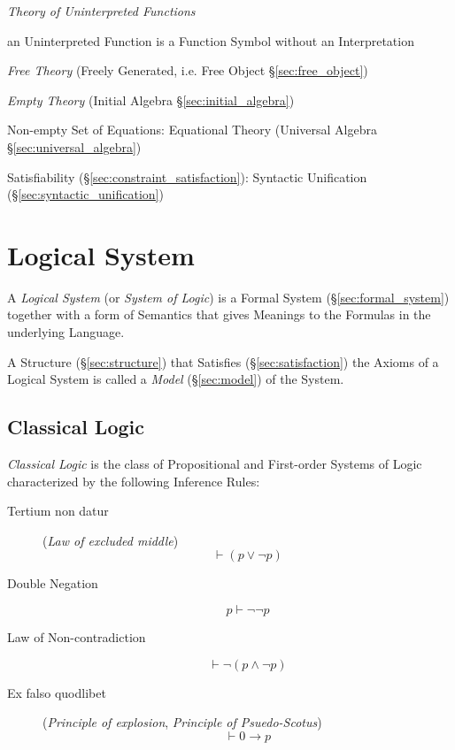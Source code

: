 \emph{Theory of Uninterpreted Functions}

an Uninterpreted Function is a Function Symbol without an
Interpretation

\emph{Free Theory} (Freely Generated, i.e. Free Object
\S\ref{sec:free_object})

\emph{Empty Theory} (Initial Algebra \S\ref{sec:initial_algebra})

Non-empty Set of Equations: Equational Theory (Universal Algebra
\S\ref{sec:universal_algebra})

Satisfiability (\S\ref{sec:constraint_satisfaction}): Syntactic
Unification (\S\ref{sec:syntactic_unification})



\section{Logical System}\label{sec:logical_system}

A \emph{Logical System} (or \emph{System of Logic}) is a Formal System
(\S\ref{sec:formal_system}) together with a form of Semantics that
gives Meanings to the Formulas in the underlying Language.

A Structure (\S\ref{sec:structure}) that Satisfies
(\S\ref{sec:satisfaction}) the Axioms of a Logical System is called a
\emph{Model} (\S\ref{sec:model}) of the System.



\subsection{Classical Logic}\label{sec:classical_logic}

\emph{Classical Logic} is the class of Propositional and
First-order Systems of Logic characterized by the following Inference
Rules:

\begin{description}

\item [Tertium non datur] (\emph{Law of excluded middle})
  \[
    \vdash(p \vee \neg p)
  \]

\item [Double Negation]
  \[
    p \vdash \neg\neg p
  \]

\item [Law of Non-contradiction]
  \[
    \vdash \neg(p \wedge \neg p)
  \]

\item [Ex falso quodlibet] (\emph{Principle of explosion},
  \emph{Principle of Psuedo-Scotus})
  \[
    \vdash 0 \rightarrow p
  \]


\end{description}

